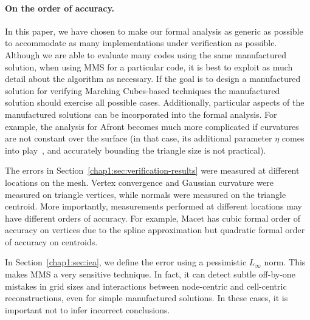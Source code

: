 \paragraph*{On the order of accuracy.}
In this paper, we have chosen to make our formal analysis as generic
as possible to accommodate as many implementations under verification
as possible. Although we are able to evaluate many codes using the same 
manufactured solution, when using MMS for a particular code, it is best to
exploit as much detail about the algorithm as necessary. If the goal is to 
design a manufactured solution for verifying Marching Cubes-based techniques 
the manufactured solution should exercise all possible cases. %
Additionally, particular aspects of the manufactured solutions can be
incorporated into the formal analysis. For example, the analysis for
Afront becomes much more complicated if curvatures are not constant
over the surface (in that case, its additional parameter $\eta$ comes
into play~\cite{Schreiner06}, and accurately bounding the triangle
size is not practical).


The errors in Section~\ref{chap1:sec:verification-results} were
measured at different locations on the mesh. Vertex convergence and
Gaussian curvature were measured on triangle vertices, while normals
were measured on the triangle centroid. 
More importantly, measurements
performed at different locations may have different orders of
accuracy. For example,
Macet has cubic formal order of accuracy on vertices due to the spline approximation
but quadratic formal order of accuracy on centroids.

In Section~\ref{chap1:sec:iea}, we define the error using a pessimistic
$L_\infty$ norm. This makes MMS a very sensitive technique. In
fact, it can detect subtle off-by-one mistakes in grid sizes
and interactions between node-centric and cell-centric
reconstructions,
even for simple manufactured solutions. In
these cases, it is important not to infer incorrect conclusions. 

%

